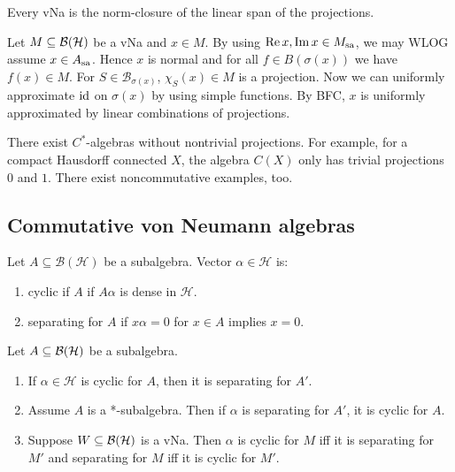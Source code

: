 \begin{corollary}
  Every vNa is the norm-closure of the linear span of the projections.
\end{corollary}

\begin{myproof}
  Let $M \subseteq \operatorname{\mathcal{B} (\mathcal{H})}$ be a vNa and $x \in M$. By using $\operatorname{Re} x, \operatorname{Im} x \in M_{\operatorname{sa}}$,
  we may WLOG assume $x \in A_{\operatorname{sa}}$. Hence $x$ is normal and for all $f \in B(\sigma(x))$ we have $f(x) \in M$.
  For $S \in \mathcal{B}_{\sigma(x)}$, $\chi_S (x) \in M$ is a projection. Now we can uniformly approximate $\operatorname{id}$ 
  on $\sigma(x)$ by using simple functions. By BFC, $x$ is uniformly approximated by linear combinations of projections.
\end{myproof}

\begin{remark}
  There exist $C^*$-algebras without nontrivial projections.
  For example, for a compact Hausdorff connected $X$, the algebra $C(X)$ only has trivial projections $0$ and $1$.
  There exist noncommutative examples, too.            
\end{remark}

\subsection{Commutative von Neumann algebras}

\begin{definition}
  Let $A \subseteq \mathcal{B}(\mathcal{H})$ be a subalgebra. Vector $\alpha \in \mathcal{H}$ is:
  \begin{enumerate}
    \item cyclic if $A$ if $A \alpha$ is dense in $\mathcal{H}$.
    \item separating for $A$ if $x \alpha = 0$ for $x \in A$ implies $x = 0$.
  \end{enumerate}
\end{definition}

\begin{proposition}
  Let $A \subseteq \operatorname{\mathcal{B} (\mathcal{H})}$ be a subalgebra.
  \begin{enumerate}
    \item If $\alpha \in \mathcal{H}$ is cyclic for $A$, then it is separating for $A'$.
    \item Assume $A$ is a *-subalgebra. Then if $\alpha$ is separating for $A'$, it is cyclic for $A$.
    \item Suppose $W \subseteq \operatorname{\mathcal{B} (\mathcal{H})}$ is a vNa. Then $\alpha$ is cyclic for $M$ iff it is separating for $M'$
    and separating for $M$ iff it is cyclic for $M'$.
  \end{enumerate}
\end{proposition}

